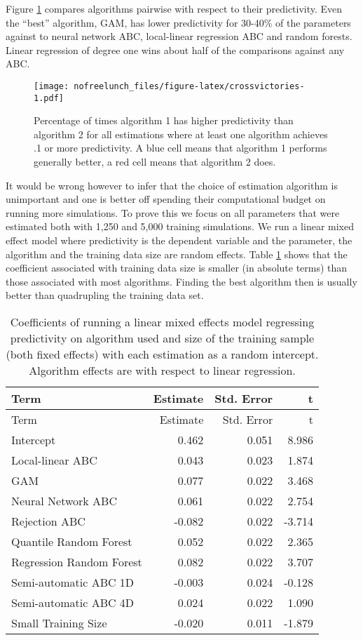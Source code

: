 \documentclass[]{article}
\begin{document}
Figure \ref{fig:crossvictories} compares algorithms pairwise with respect to their predictivity.
Even the ``best'' algorithm, GAM, has lower predictivity for 30-40\% of the parameters against to neural network ABC, local-linear regression ABC and random forests.
Linear regression of degree one wins about half of the comparisons against any ABC.

\begin{figure}
\centering
\texttt{[image: nofreelunch\_files/figure-latex/crossvictories-1.pdf]}
\caption{\label{fig:crossvictories}Percentage of times algorithm 1 has higher predictivity than algorithm 2 for all estimations where at least one algorithm achieves .1 or more predictivity. A blue cell means that algorithm 1 performs generally better, a red cell means that algorithm 2 does.}
\end{figure}

It would be wrong however to infer that the choice of estimation algorithm is unimportant and one is better off spending their computational budget on running more simulations.
To prove this we focus on all parameters that were estimated both with 1,250 and 5,000 training simulations. We run a linear mixed effect model where predictivity is the dependent variable and the parameter, the algorithm and the training data size are random effects.
Table \ref{tab:bigvssmall} shows that the coefficient associated with training data size is smaller (in absolute terms) than those associated with most algorithms.
Finding the best algorithm then is usually better than quadrupling the training data set.

\begin{longtable}[]{@{}lrrr@{}}
\caption{\label{tab:bigvssmall}Coefficients of running a linear mixed effects model regressing predictivity on algorithm used and size of the training sample (both fixed effects) with each estimation as a random intercept. Algorithm effects are with respect to linear regression.}\tabularnewline
\toprule
Term & Estimate & Std. Error & t\tabularnewline
\midrule
\endfirsthead
\toprule
Term & Estimate & Std. Error & t\tabularnewline
\midrule
\endhead
Intercept & 0.462 & 0.051 & 8.986\tabularnewline
Local-linear ABC & 0.043 & 0.023 & 1.874\tabularnewline
GAM & 0.077 & 0.022 & 3.468\tabularnewline
Neural Network ABC & 0.061 & 0.022 & 2.754\tabularnewline
Rejection ABC & -0.082 & 0.022 & -3.714\tabularnewline
Quantile Random Forest & 0.052 & 0.022 & 2.365\tabularnewline
Regression Random Forest & 0.082 & 0.022 & 3.707\tabularnewline
Semi-automatic ABC 1D & -0.003 & 0.024 & -0.128\tabularnewline
Semi-automatic ABC 4D & 0.024 & 0.022 & 1.090\tabularnewline
Small Training Size & -0.020 & 0.011 & -1.879\tabularnewline
\bottomrule
\end{longtable}
\end{document}
